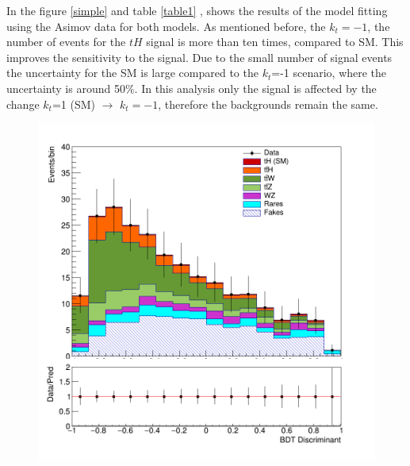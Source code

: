\begin{linenumbers}
In the figure \ref{simple} and table \ref{table1} , shows the results of the model fitting using the Asimov data for both models. As mentioned before, the  $k_t=-1$, the number of events for the $tH$ signal is more than ten times, compared to SM. This improves the sensitivity to the signal. Due to the small number of signal events the uncertainty for the SM is large compared to the $k_t$=-1 scenario, where the uncertainty is around 50$\%$. In this analysis only the signal is affected by the change $k_t$=1 (SM) $\rightarrow$  $k_t=-1$, therefore the backgrounds remain the same.
\begin{figure}[!htbp]
	\centering
	\begin{minipage}[b]{0.48\textwidth}
		\includegraphics[width=\textwidth]{Chapter4/simple.png}
	\end{minipage}
	\hfill
	\begin{minipage}[b]{0.48\textwidth}

\end{minipage}
\end{figure}
\end{linenumbers}
